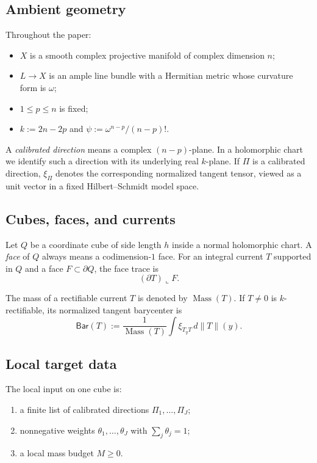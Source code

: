 \documentclass[11pt]{article}
\numberwithin{equation}{section}
\theoremstyle{plain}
\theoremstyle{definition}
\theoremstyle{remark}
\DeclareMathOperator{\Mass}{Mass}
\begin{document}
\subsection{Ambient geometry}

Throughout the paper:
\begin{itemize}
\item $X$ is a smooth complex projective manifold of complex dimension $n$;
\item $L \to X$ is an ample line bundle with a Hermitian metric whose curvature form is $\omega$;
\item $1 \le p \le n$ is fixed;
\item $k := 2n-2p$ and $\psi := \omega^{n-p}/(n-p)!$.
\end{itemize}

A \emph{calibrated direction} means a complex $(n-p)$-plane.  In a holomorphic chart we identify such a direction with its underlying real $k$-plane.  If $\Pi$ is a calibrated direction, $\xi_\Pi$ denotes the corresponding normalized tangent tensor, viewed as a unit vector in a fixed Hilbert--Schmidt model space.

\subsection{Cubes, faces, and currents}

Let $Q$ be a coordinate cube of side length $h$ inside a normal holomorphic chart.  A \emph{face} of $Q$ always means a codimension-$1$ face.  For an integral current $T$ supported in $Q$ and a face $F \subset \partial Q$, the face trace is
\[
(\partial T)\llcorner F.
\]

The mass of a rectifiable current $T$ is denoted by $\Mass(T)$.  If $T \neq 0$ is $k$-rectifiable, its normalized tangent barycenter is
\[
\mathsf{Bar}(T)
:=
\frac{1}{\Mass(T)}
\int \xi_{T_yT}\, d\|T\|(y).
\]

\subsection{Local target data}

The local input on one cube is:
\begin{enumerate}
\item a finite list of calibrated directions $\Pi_1,\dots,\Pi_J$;
\item nonnegative weights $\theta_1,\dots,\theta_J$ with $\sum_j \theta_j = 1$;
\item a local mass budget $M \ge 0$.
\end{enumerate}
\end{document}
